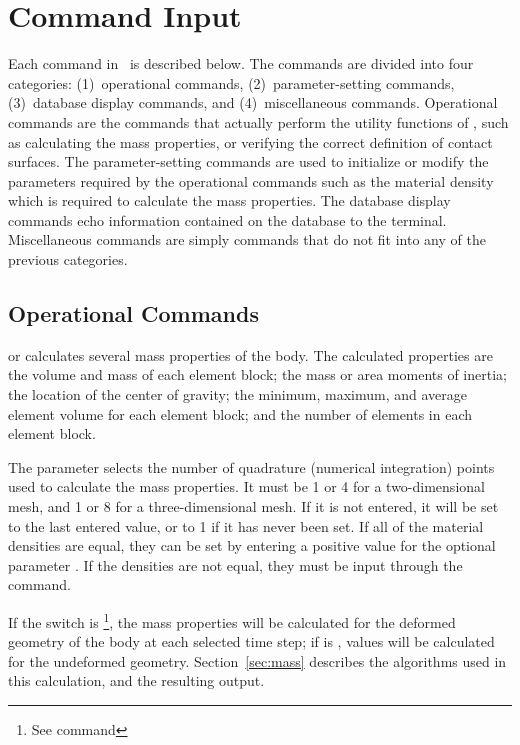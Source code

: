 \chapter{Command Input} \label{c:commands}

Each command in \numbers\ is described below.  The commands are divided
into four categories: (1)~operational commands, (2)~parameter-setting
commands, (3)~database display commands, and (4)~miscellaneous commands.
Operational commands are the commands that actually perform the utility
functions of \numbers, such as calculating the mass properties, or
verifying the correct definition of contact surfaces.  The
parameter-setting commands are used to initialize or modify the
parameters required by the operational commands such as the material
density which is required to calculate the mass properties. The database
display commands echo information contained on the database to the
terminal.  Miscellaneous commands are simply commands that do not fit
into any of the previous categories.



\newpage
\section{Operational Commands}\label{sec:oper}

 {
 or  calculates several mass properties of the
body.  The calculated properties are the volume and mass of each element
block; the mass or area moments of inertia; the location of the center
of gravity; the minimum, maximum, and average element volume for each
element block; and the number of elements in each element block.

The parameter  selects the number of quadrature (numerical
integration) points used to calculate the mass properties. It must be 1
or 4 for a two-dimensional mesh, and 1 or 8 for a three-dimensional
mesh.  If it is not entered, it will be set to the last entered value,
or to 1 if it has never been set.  If all of the material densities are
equal, they can be set by entering a positive value for the optional
parameter . If the densities are not equal, they must be
input through the  command.

If the  switch is \footnote{See command
}, the mass properties will be calculated for the deformed
geometry of the body at each selected time step; if  is
\footnotemark[1], values will be calculated for the undeformed
geometry. Section~\ref{sec:mass} describes the algorithms used in this
calculation, and the resulting output.
}

